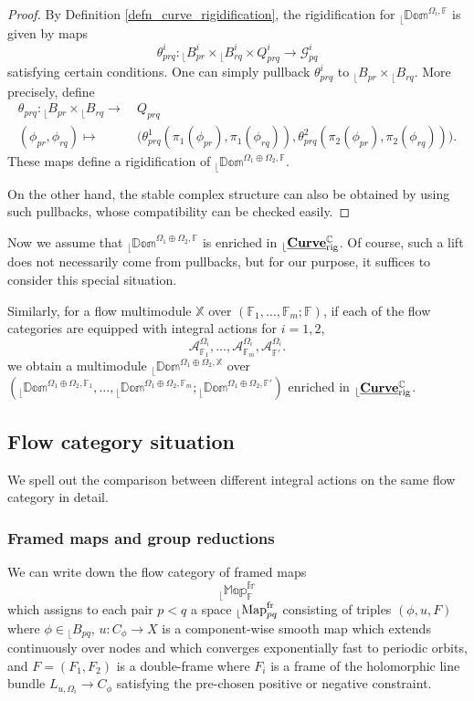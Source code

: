 \documentclass[reqno, 10pt]{amsart}
\numberwithin{equation}{section}
\numberwithin{equation}{section}
\theoremstyle{definition}
\theoremstyle{remark}
\newcommand{\beqn}{\begin{equation*}}
\newcommand{\eeqn}{\end{equation*}}
\newcommand{\mb}{\mathbb}
\newcommand{\mc}{\mathcal}
\renewcommand{\outer}{{}_{\lfloor}}
\newcommand{\uds}[1]{\underline{\smash{#1}}}
\begin{document}
\begin{proof}
By Definition \ref{defn_curve_rigidification}, the rigidification for $\outer \mb{Dom}^{\Omega_i, {\mb F}}$ is given by maps
\beqn
\theta_{prq}^i: \outer B_{pr}^i \times \outer B_{rq}^i \times Q_{prq}^i \to {\mc G}_{pq}^i
\eeqn
satisfying certain conditions. One can simply pullback $\theta_{prq}^i$ to $\outer B_{pr}\times \outer B_{rq}$. More precisely, define
\beqn
\begin{split}
\theta_{prq}: \outer B_{pr} \times \outer B_{rq} \to &\ Q_{prq} \\
(\phi_{pr}, \phi_{rq}) \mapsto &\ \Big( \theta_{prq}^1( \pi_1(\phi_{pr}), \pi_1(\phi_{rq})), \theta_{prq}^2( \pi_2(\phi_{pr}), \pi_2(\phi_{rq})) \Big).
\end{split}
\eeqn
These maps define a rigidification of $\outer \mb{Dom}^{\Omega_1 \oplus \Omega_2, {\mb F}}$.

On the other hand, the stable complex structure can also be obtained by using such pullbacks, whose compatibility can be checked easily.
\end{proof}

Now we assume that $\outer \mb{Dom}^{\Omega_1 \oplus \Omega_2, {\mb F}}$ is enriched in $\outer \uds{\bf Curve}_{\rm rig}^{\mb C}$. Of course, such a lift does not necessarily come from pullbacks, but for our purpose, it suffices to consider this special situation.

Similarly, for a flow multimodule ${\mb X}$ over $({\mb F}_1, \ldots, {\mb F}_m; {\mb F})$, if each of the flow categories are equipped with integral actions for $i = 1, 2$,
\beqn
{\mc A}_{{\mb F}_1}^{\Omega_i}, \ldots, {\mc A}_{{\mb F}_m}^{\Omega_i}, {\mc A}_{{\mb F}'}^{\Omega_i}.
\eeqn 
we obtain a multimodule $\outer \mb{Dom}^{\Omega_1 \oplus \Omega_2, {\mb X}}$ over $(\outer \mb{Dom}^{\Omega_1 \oplus \Omega_2, {\mb F}_1}, \ldots, \outer \mb{Dom}^{\Omega_1 \oplus \Omega_2, {\mb F}_m}; \outer \mb{Dom}^{\Omega_1 \oplus \Omega_2, {\mb F}'})$ enriched in $\outer \uds{\bf Curve}_{\rm rig}^{\mb C}$.

\subsection{Flow category situation}\label{subsec:flow-double}
We spell out the comparison between different integral actions on the same flow category in detail.

\subsubsection{Framed maps and group reductions}
We can write down the flow category of framed maps
\beqn
\outer \mb{Map}^{\mb{fr}}_{\mb F}
\eeqn
which assigns to each pair $p<q$ a space $\outer {\rm Map}_{pq}^{\rm fr}$ consisting of triples $(\phi, u, F)$ where $\phi \in \outer B_{pq}$, $u: C_\phi \to X$ is a component-wise smooth map which extends continuously over nodes and which converges exponentially fast to periodic orbits, and $F = (F_1, F_2)$ is a double-frame where $F_i$ is a frame of the holomorphic line bundle $L_{u, \Omega_i} \to C_\phi$ satisfying the pre-chosen positive or negative constraint.
\end{document}
